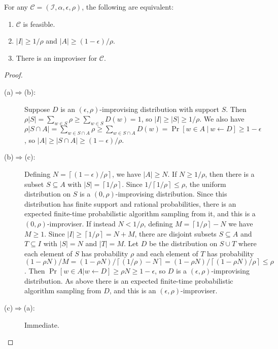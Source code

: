 \documentclass[a4paper,USenglish,numberwithinsect]{lipics}
\theoremstyle{plain}
\theoremstyle{definition}
\newcommand{\ceil}[1]{\left\lceil #1\right\rceil}
\newcommand{\suchthat}{\:|\:}
\newcommand{\improvs}{I}
\newcommand{\valids}{A}
\begin{document}
\begin{theorem} \label{theorem:feasibility}
For any $\mathcal{C} = (\mathcal{\improvs}, \alpha, \epsilon, \rho)$, the following are equivalent:
\begin{enumerate}[\quad (a)]
\item $\mathcal{C}$ is feasible.
\item $|\improvs| \ge 1/\rho$ and $|\valids| \ge (1-\epsilon)/\rho$.
\item There is an improviser for $\mathcal{C}$.
\end{enumerate}
\end{theorem}
\begin{proof}
\begin{description}
\item[(a)$\Rightarrow$(b):] Suppose $D$ is an $(\epsilon,\rho)$-improvising distribution with support $S$. Then $\rho |S| = \sum_{w \in S} \rho \ge \sum_{w \in S} D(w) = 1$, so $|\improvs| \ge |S| \ge 1/\rho$. We also have $\rho |S \cap \valids| = \sum_{w \in S \cap \valids} \rho \ge \sum_{w \in S \cap \valids} D(w) = \Pr[ w \in \valids \suchthat w \leftarrow D] \ge 1 - \epsilon$, so $|\valids| \ge |S \cap \valids| \ge (1-\epsilon)/\rho$.

\item[(b)$\Rightarrow$(c):] Defining $N = \ceil{(1-\epsilon)/\rho}$, we have $|\valids| \ge N$. If $N \ge 1/\rho$, then there is a subset $S \subseteq \valids$ with $|S| = \ceil{1/\rho}$. Since $1/\ceil{1/\rho} \le \rho$, the uniform distribution on $S$ is a $(0,\rho)$-improvising distribution. Since this distribution has finite support and rational probabilities, there is an expected finite-time probabilistic algorithm sampling from it, and this is a $(0,\rho)$-improviser. If instead $N < 1/\rho$, defining $M = \ceil{1/\rho} - N$ we have $M \ge 1$. Since $|\improvs| \ge \ceil{1/\rho} = N + M$, there are disjoint subsets $S \subseteq \valids$ and $T \subseteq \improvs$ with $|S| = N$ and $|T| = M$. Let $D$ be the distribution on $S \cup T$ where each element of $S$ has probability $\rho$ and each element of $T$ has probability $(1 - \rho N) / M = (1 - \rho N) / \ceil{(1/\rho) - N} = (1 - \rho N) / \ceil{(1 - \rho N) / \rho} \le \rho$. Then $\Pr[ w \in \valids | w \leftarrow D ] \ge \rho N \ge 1 - \epsilon$, so $D$ is a $(\epsilon,\rho)$-improvising distribution. As above there is an expected finite-time probabilistic algorithm sampling from $D$, and this is an $(\epsilon,\rho)$-improviser.

\item[(c)$\Rightarrow$(a):] Immediate. \qedhere
\end{description} 
\end{proof}
\end{document}
